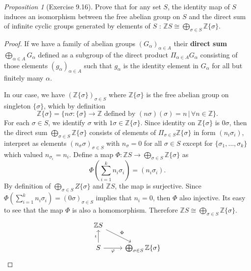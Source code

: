 \documentclass[a4paper]{article}
\theoremstyle{remark}
\newtheorem{prop}{Proposition}
\newcommand{\Z}{\mathbb{Z}} %
\begin{document}
\begin{prop}[Exercise 9.16] 
	Prove that for any set $S$, the identity map of $S$ induces an isomorphism between the free abelian group on $S$ and the direct sum of infinite cyclic groups generated by elements of $S$ : $\Z S \cong \bigoplus_{\sigma \in S} \Z \{\sigma\}$.  
 \end{prop}
\begin{proof}
	If we have a family of abelian groups $(G_{\alpha})_{\alpha \in A}$ their \textbf{direct sum} $\bigoplus_{\alpha \in A} G_{\alpha}$ defined as a subgroup of the direct product $\Pi_{\alpha \in A} G_{\alpha}$ consisting of those elements $(g_{\alpha})_{\alpha \in A}$ such that $g_{\alpha}$ is the identity element in $G_{\alpha}$ for all but finitely many $\alpha$. 
	
	In our case, we have $(\Z \{\sigma\})_{\sigma \in S}$ where $\Z\{\sigma\}$ is the free abelian group on singleton $\{\sigma\}$, which by definition 
	$$
	\Z \{\sigma\} = \{n\sigma : \{\sigma\} \to \Z \text{ defined by }(n\sigma)(\sigma) = n \,|\, \forall n \in \Z \}.
	$$ 
	For each $\sigma \in S$, we identify $\sigma$ with $1\sigma \in \Z \{\sigma\}$. Since identity on $\Z \{\sigma\}$ is $0\sigma$, then the direct sum $\bigoplus_{\sigma \in S} \Z\{\sigma\}$ consists of elements of $\Pi_{\sigma \in S}\Z \{\sigma\}$ in form $(n_i\sigma_i)$, interpret as elements $(n_{\sigma} \sigma)_{\sigma \in S}$ with $n_{\sigma} = 0$ for all $\sigma \in S$ except for $\{\sigma_1,\dots,\sigma_k\}$ which valued $n_{\sigma_i} = n_i$. Define a map $\Phi : \Z S \to \bigoplus_{\sigma \in S} \Z\{\sigma\}$ as
	$$
	\Phi (\sum_{i=1}^{k} n_i \sigma_i) = (n_i \sigma_i).
	$$
	By definition of $\bigoplus_{\sigma \in S} Z\{\sigma\}$ and $\Z S$, the map is surjective. Since $\Phi (\sum_{i=1}^{k} n_i \sigma_i) = (0 \sigma)_{\sigma \in S}$ implies that $n_i = 0$, then $\Phi$ also injective. Its easy to see that the map $\Phi$ is also a homomorphism. Therefore $\Z S \cong \bigoplus_{\sigma \in S} \Z \{\sigma\}$.
	\[
	\begin{tikzcd}
	\Z S \arrow[dr,"\Phi"] & \\
	S \arrow[u,"\iota"] \arrow[r,"\varphi",swap] & \bigoplus_{\sigma \in S} \Z \{\sigma\}
	\end{tikzcd}
	\]
\end{proof}
\end{document}
